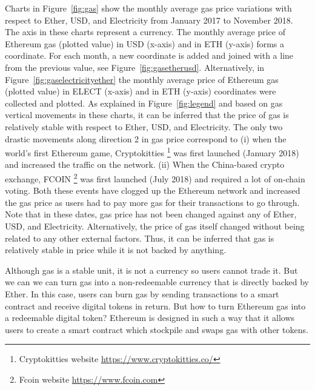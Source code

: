 Charts in Figure~\ref{fig:gas} show the monthly average gas price variations with respect to Ether, USD, and Electricity from January 2017 to November 2018. The axis in these charts represent a currency. The monthly average price of  Ethereum gas (plotted value) in USD (x-axis) and in ETH (y-axis) forms a coordinate. For each month, a new coordinate is added and joined with a line from the previous value, see Figure~\ref{fig:gasetherusd}. Alternatively, in Figure~\ref{fig:gaselectricityether} the monthly average price of  Ethereum gas (plotted value) in ELECT (x-axis) and in ETH (y-axis) coordinates were collected and plotted. As explained in Figure~\ref{fig:legend} and based on  gas vertical movements in these charts, it can be inferred that the price of gas is relatively stable with respect to Ether, USD, and Electricity. The only two drastic movements along direction 2 in gas price correspond to (i) when the world's first Ethereum game, Cryptokitties \footnote{Cryptokitties website \url{https://www.cryptokitties.co/}} was first launched (January 2018) and increased the traffic on the network. (ii) When the China-based crypto exchange, FCOIN \footnote{Fcoin website \url{https://www.fcoin.com}} was first launched (July 2018) and required a lot of on-chain voting. Both these events have clogged up the Ethereum network and increased the gas price as users had to pay more gas for their transactions to go through.
Note that in these dates, gas price has not been changed against any of Ether, USD, and Electricity. Alternatively, the price of gas itself changed without being related to any other external factors. Thus, it can be inferred that gas is relatively stable in price while it is not backed by anything. \par
Although gas is a stable unit, it is not a currency so users cannot trade it. But we can we can turn gas  into a non-redeemable currency that is directly backed by Ether. In this case, users can burn gas by sending transactions to a smart contract and receive digital tokens in return. But how to turn Ethereum gas into a redeemable digital token? Ethereum is designed in such a way that it allows users to create a smart contract which stockpile and swaps gas with other tokens. \par
